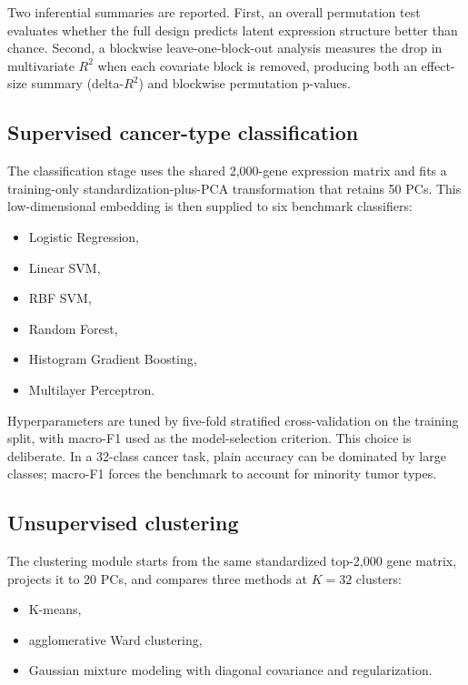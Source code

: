 \documentclass[11pt]{article}
\begin{document}
Two inferential summaries are reported. First, an overall permutation test evaluates whether the full design predicts latent expression structure better than chance. Second, a blockwise leave-one-block-out analysis measures the drop in multivariate $R^2$ when each covariate block is removed, producing both an effect-size summary (delta-$R^2$) and blockwise permutation p-values.

\subsection{Supervised cancer-type classification}
The classification stage uses the shared 2,000-gene expression matrix and fits a training-only standardization-plus-PCA transformation that retains 50 PCs. This low-dimensional embedding is then supplied to six benchmark classifiers:

\begin{itemize}
  \item Logistic Regression,
  \item Linear SVM,
  \item RBF SVM,
  \item Random Forest,
  \item Histogram Gradient Boosting,
  \item Multilayer Perceptron.
\end{itemize}

Hyperparameters are tuned by five-fold stratified cross-validation on the training split, with macro-F1 used as the model-selection criterion. This choice is deliberate. In a 32-class cancer task, plain accuracy can be dominated by large classes; macro-F1 forces the benchmark to account for minority tumor types.

\subsection{Unsupervised clustering}
The clustering module starts from the same standardized top-2,000 gene matrix, projects it to 20 PCs, and compares three methods at $K = 32$ clusters:

\begin{itemize}
  \item K-means,
  \item agglomerative Ward clustering,
  \item Gaussian mixture modeling with diagonal covariance and regularization.
\end{itemize}
\end{document}
